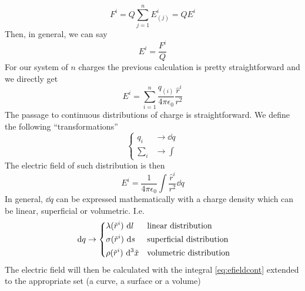 \documentclass[../electromagnetism]{subfiles}
\begin{document}
\begin{equation}
	F^i=Q\sum_{j=1}^nE^i_{(j)}=QE^i
	\label{eq:esfield}
\end{equation}
Then, in general, we can say
\begin{equation}
	E^i=\frac{F^i}{Q}
	\label{eq:efielddef}
\end{equation}
For our system of $n$ charges the previous calculation is pretty straightforward and we directly get
\begin{equation}
	E^i=\sum_{i=1}^n\frac{q_{(i)}}{4\pi\epsilon_0}\frac{\hat{r}^i}{r^2}
	\label{eq:esfieldsystem}
\end{equation}
The passage to continuous distributions of charge is straightforward. We define the following ``transformations''
\begin{equation*}
	\left\{ \begin{aligned}
		q_i&\longrightarrow\dd q\\
		\sum_i&\longrightarrow\int
\end{aligned}\right.
\end{equation*}
The electric field of such distribution is then
\begin{equation}
	E^i=\frac{1}{4\pi\epsilon_0}\int\frac{\hat{r}^i}{r^2}\dd q
	\label{eq:efieldcont}
\end{equation}
In general, $\dd q$ can be expressed mathematically with a charge density which can be linear, superficial or volumetric. I.e.
\begin{equation}
	\ \mathrm{d} q\to\begin{dcases}
		\lambda(\tilde{r}^i)\ \mathrm{d} l&\text{linear distribution}\\
		\sigma(\tilde{r}^i)\ \mathrm{d} s&\text{superficial distribution}\\
		\rho(\tilde{r}^i)\ \mathrm{d}^3\tilde{x}&\text{volumetric distribution}
	\end{dcases}
	\label{eq:chargedist}
\end{equation}
The electric field will then be calculated with the integral \eqref{eq:efieldcont} extended to the appropriate set (a curve, a surface or a volume)
\end{document}
